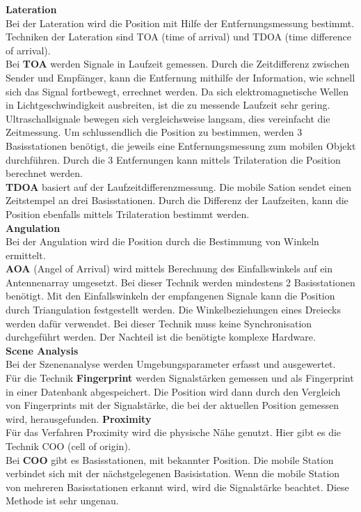     \textbf{Lateration}\\
    Bei der Lateration wird die Position mit Hilfe der Entfernungsmessung bestimmt.
    Techniken der Lateration sind TOA (time of arrival) und TDOA (time difference of arrival).\\
    Bei \textbf{TOA} werden Signale in Laufzeit gemessen. Durch die Zeitdifferenz zwischen Sender und Empfänger, kann die Entfernung mithilfe der Information, wie schnell sich das Signal fortbewegt, errechnet werden. Da sich elektromagnetische Wellen in Lichtgeschwindigkeit ausbreiten, ist die zu messende Laufzeit sehr gering. Ultraschallsignale bewegen sich vergleichsweise langsam, dies vereinfacht die Zeitmessung. 
    Um schlussendlich die Position zu bestimmen, werden 3 Basisstationen benötigt, die jeweils eine Entfernungsmessung zum mobilen Objekt durchführen. Durch die 3 Entfernungen kann mittels Trilateration die Position berechnet werden.
    \\ %
    \textbf{TDOA} basiert auf der Laufzeitdifferenzmessung. 
    Die mobile Sation sendet einen Zeitstempel an drei Basisstationen. Durch die Differenz der Laufzeiten, kann die Position ebenfalls mittels Trilateration bestimmt werden.
    \\ %
    \textbf{Angulation}\\
    Bei der Angulation wird die Position durch die Bestimmung von Winkeln ermittelt. \\
    \textbf{AOA} (Angel of Arrival) wird mittels Berechnung des Einfallswinkels auf ein Antennenarray umgesetzt. Bei dieser Technik werden mindestens 2 Basisstationen benötigt. Mit den Einfallswinkeln der empfangenen Signale kann die Position durch Triangulation festgestellt werden. Die Winkelbeziehungen eines Dreiecks werden dafür verwendet.
    Bei dieser Technik muss keine Synchronisation durchgeführt werden. Der Nachteil ist die benötigte komplexe Hardware. 
    \\ %
    \textbf{Scene Analysis}\\
    Bei der Szenenanalyse werden Umgebungsparameter erfasst und ausgewertet.\\
    Für die Technik \textbf{Fingerprint} werden Signalstärken gemessen und als Fingerprint in einer Datenbank abgespeichert. Die Position wird dann durch den Vergleich von Fingerprints mit der Signalstärke, die bei der aktuellen Position gemessen wird, herausgefunden.
    \textbf{Proximity}\\
    Für das Verfahren Proximity wird die physische Nähe genutzt.
    Hier gibt es die Technik COO (cell of origin). \\
    Bei \textbf{COO} gibt es Basisstationen, mit bekannter Position. Die mobile Station verbindet sich mit der nächstgelegenen Basisistation. Wenn die mobile Station von mehreren Basisstationen erkannt wird, wird die Signalstärke beachtet. Diese Methode ist sehr ungenau.
    \\ %

